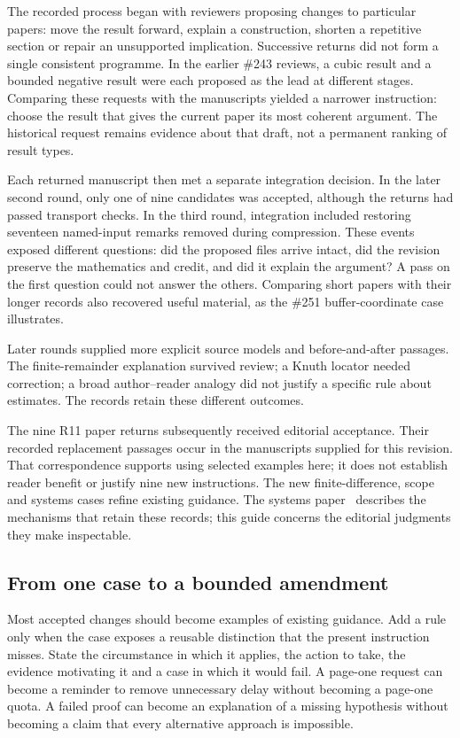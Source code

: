 The recorded process began with reviewers proposing changes to particular
papers: move the result forward, explain a construction, shorten a repetitive
section or repair an unsupported implication. Successive returns did not form
a single consistent programme. In the earlier \#243 reviews, a cubic result
and a bounded negative result were each proposed as the lead at different
stages. Comparing these requests with the manuscripts yielded a narrower
instruction: choose the result that gives the current paper its most coherent
argument. The historical request remains evidence about that draft, not a
permanent ranking of result types.

Each returned manuscript then met a separate integration decision. In the
later second round, only one of nine candidates was accepted, although the
returns had passed transport checks. In the third round, integration included
restoring seventeen named-input remarks removed during compression. These
events exposed different questions: did the proposed files arrive intact,
did the revision preserve the mathematics and credit, and did it explain the
argument? A pass on the first question could not answer the others. Comparing
short papers with their longer records also recovered useful material, as the
\#251 buffer-coordinate case illustrates.

Later rounds supplied more explicit source models and before-and-after
passages. The finite-remainder explanation survived review; a Knuth locator
needed correction; a broad author--reader analogy did not justify a specific
rule about estimates. The records retain these different outcomes.

The nine R11 paper returns subsequently received editorial acceptance. Their
recorded replacement passages occur in the manuscripts supplied for this
revision. That correspondence supports using selected examples here; it does
not establish reader benefit or justify nine new instructions. The new
finite-difference, scope and systems cases refine existing guidance. The
systems paper~\cite{systems} describes the mechanisms that retain these
records; this guide concerns the editorial judgments they make inspectable.

\subsection{From one case to a bounded amendment}

Most accepted changes should become examples of existing guidance. Add a rule
only when the case exposes a reusable distinction that the present instruction
misses. State the circumstance in which it applies, the action to take, the
evidence motivating it and a case in which it would fail. A page-one request
can become a reminder to remove unnecessary delay without becoming a page-one
quota. A failed proof can become an explanation of a missing hypothesis without
becoming a claim that every alternative approach is impossible.

